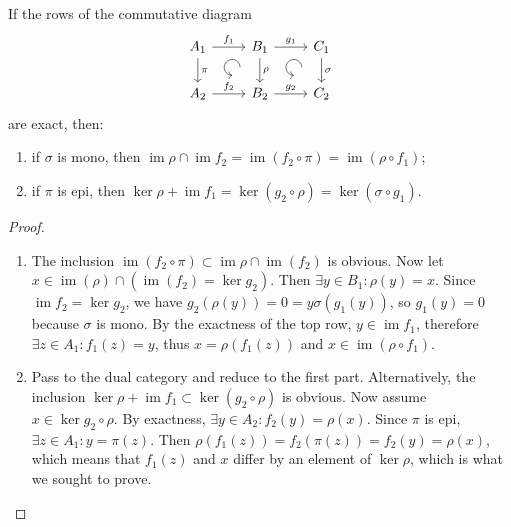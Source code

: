 \documentclass[english,letterpaper]{article}%
\numberwithin{equation}{section}
\numberwithin{figure}{section}
\numberwithin{table}{section}
\theoremstyle{definition}
\theoremstyle{definition}
\theoremstyle{definition}
\theoremstyle{plain}
\theoremstyle{plain}
\theoremstyle{plain}
\theoremstyle{plain}
\theoremstyle{remark}
\theoremstyle{remark}
\DeclareMathOperator{\im}{im}
\begin{document}
\begin{lem}[3-lemma]
    If the rows of the commutative diagram 
    \[\begin{tikzcd}[every matrix/.append style={name=m},   
        execute at end picture={\draw [<-] ([xshift=-7mm,yshift=-10mm]m-1-2.north) arc[start angle=-90,delta angle=-270,radius=0.2cm];
        \draw [<-] ([xshift=-7mm,yshift=-10mm]m-1-3.north) arc[start angle=-90,delta angle=-270,radius=0.2cm];}]
        A_1 \arrow[r,"f_1"]\arrow[d,"\pi"] & B_1\arrow[d,"\rho"]\arrow[r,"g_1"] & C_1\arrow[d,"\sigma"] \\
        A_2\arrow[r,"f_2"] &B_2 \arrow[r,"g_2"] &C_2 
    \end{tikzcd}\]
    are exact, then:
    \begin{enumerate}
        \item if $\sigma$ is mono, then $\im\rho\cap\im f_2=\im(f_2\circ \pi)=\im(\rho\circ f_1)$;
        \item if $\pi$ is epi, then $\ker\rho+\im f_1=\ker(g_2\circ\rho)=\ker(\sigma\circ g_1)$.
    \end{enumerate}
\end{lem}
\begin{proof}
    \begin{enumerate}
        \item The inclusion $\im(f_2\circ\pi)\subset \im\rho\cap \im(f_2)$ is obvious. Now let $x\in \im(\rho)\cap(\im(f_2)=\ker g_2)$. Then $\exists y\in B_1: \rho(y)=x$. Since $\im f_2=\ker g_2$, we have $g_2(\rho(y))=0=y\sigma(g_1(y))$, so $g_1(y)=0$ because $\sigma$ is mono. By the exactness of the top row, $y\in\im f_1$, therefore $\exists z\in A_1:f_1(z)=y$, thus $x=\rho(f_1(z))$ and $x\in\im(\rho\circ f_1)$.
        \item Pass to the dual category and reduce to the first part. Alternatively, the inclusion $\ker\rho+\im f_1\subset \ker(g_2\circ\rho)$ is obvious. Now assume $x\in \ker g_2\circ\rho$. By exactness, $\exists y\in A_2:f_2(y)=\rho(x)$. Since $\pi$ is epi, $\exists z\in A_1:y=\pi(z)$. Then $\rho(f_1(z))=f_2(\pi(z))=f_2(y)=\rho(x)$, which means that $f_1(z)$ and $x$ differ by an element of $\ker\rho$, which is what we sought to prove.
    \end{enumerate}
\end{proof}
\end{document}
